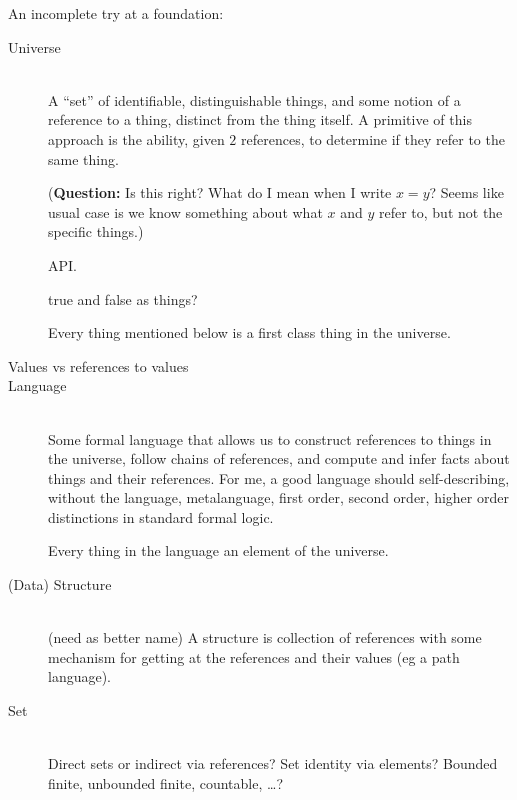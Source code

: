 \documentclass[11pt,openany]{book}
\begin{document}
An incomplete try at a foundation:
\begin{description}

\item[Universe]\mbox{}\\
A ``set'' of identifiable, distinguishable
things,
and some notion of a reference to a thing, distinct from the thing
itself.
A primitive of this approach is the ability, given $2$ references,
to determine if they refer to the same thing.
\par
(\textbf{Question:}
Is this right? What do I mean when I write $x=y$?
Seems like usual case is we know something about what $x$ and $y$
refer to, but not the specific things.)
\par
API. 
\par
\textsf{true} and \textsf{false} as things?
\par
Every thing mentioned below is a first class thing in the universe.

\item[Values vs references to values]%

\item[Language]\mbox{}\\
Some formal language that allows us 
to construct references to things in the universe, 
follow chains of references, and compute and infer facts 
about things and their references. 
For me, a good language should self-describing, without the
language, metalanguage, first order, second order, higher order 
distinctions in standard formal logic.
\par
Every thing in the language an element of the universe.

\item[(Data) Structure]\mbox{}\\
(need as better name)
A structure is collection of references with
some mechanism for getting at the references and their values
(eg a path language).

\item[Set]  \mbox{}\\
Direct sets or indirect via references?
Set identity via elements?
Bounded finite, unbounded finite, countable, \ldots ?


\end{description}
\end{document}
